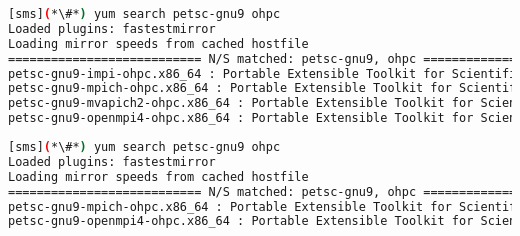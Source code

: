 \begin{lstlisting}[language=bash,keywords={}]
[sms](*\#*) yum search petsc-gnu9 ohpc
Loaded plugins: fastestmirror
Loading mirror speeds from cached hostfile
=========================== N/S matched: petsc-gnu9, ohpc ===========================
petsc-gnu9-impi-ohpc.x86_64 : Portable Extensible Toolkit for Scientific Computation
petsc-gnu9-mpich-ohpc.x86_64 : Portable Extensible Toolkit for Scientific Computation
petsc-gnu9-mvapich2-ohpc.x86_64 : Portable Extensible Toolkit for Scientific Computation
petsc-gnu9-openmpi4-ohpc.x86_64 : Portable Extensible Toolkit for Scientific Computation
\end{lstlisting}
\fi

\begin{lstlisting}[language=bash,keywords={}]
[sms](*\#*) yum search petsc-gnu9 ohpc
Loaded plugins: fastestmirror
Loading mirror speeds from cached hostfile
=========================== N/S matched: petsc-gnu9, ohpc ===========================
petsc-gnu9-mpich-ohpc.x86_64 : Portable Extensible Toolkit for Scientific Computation
petsc-gnu9-openmpi4-ohpc.x86_64 : Portable Extensible Toolkit for Scientific Computation
\end{lstlisting}
\fi

